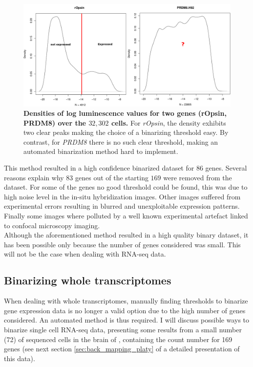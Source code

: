 	\begin{figure}[h]
\centerline{\includegraphics[width=\linewidth]{gfx/chapter2/densities_bina.png}}
\caption{{\bf Densities of log luminescence values for two genes (rOpsin, PRDM8) over the $32,302$ cells.} For {\it{rOpsin}}, the density exhibits two clear peaks making the choice of a binarizing threshold easy. By contrast, for {\it{PRDM8}} there is no such clear threshold, making an automated binarization method hard to implement.}\label{fig:densities_bina}
	\end{figure}
	
	This method resulted in a high confidence binarized dataset for $86$ genes. Several reasons explain why $83$ genes out of the starting $169$ were removed from the dataset. For some of the genes no good threshold could be found, this was due to high noise level in the in-situ hybridization images. Other images suffered from experimental errors resulting in blurred and unexploitable expression patterns. Finally some images where polluted by a well known experimental artefact linked to confocal microscopy imaging.\\
	
	Although the aforementioned method resulted in a high quality binary dataset, it has been possible only because the number of genes considered was small. This will not be the case when dealing with RNA-seq data.

  \subsection{Binarizing whole transcriptomes}
  
  When dealing with whole transcriptomes, manually finding thresholds to binarize gene expression data is no longer a valid option due to the high number of genes considered. An automated method is thus required. I will discuss possible ways to binarize single cell RNA-seq data, presenting some results from a small number (72) of sequenced cells in the brain of \platy{}, containing the count number for 169 genes (see next section \ref{sec:back_mapping_platy} of a detailed presentation of this data).\\
  
